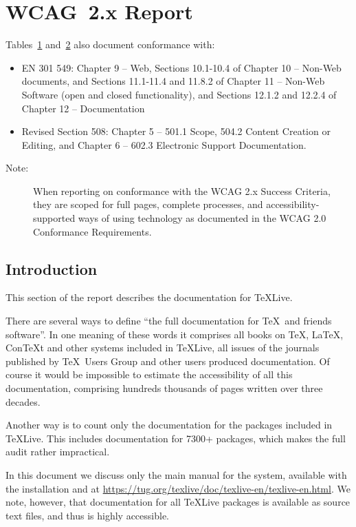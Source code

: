 \documentclass[titlepage]{article}
\begin{document}
\clearpage
\section{WCAG~2.x Report}
\label{sec:wcag}

Tables~\hyperref[sec:WCAG-A]{1} and~\hyperref[sec:WCAG-AA]{2} also document 
conformance with: 
\begin{itemize}
\item EN 301 549:  Chapter 9 – Web, Sections 10.1-10.4 of Chapter 10 – 
    Non-Web documents, and Sections 11.1-11.4 and 11.8.2 of Chapter 11 – 
    Non-Web Software (open and closed functionality), and Sections 12.1.2 
    and 12.2.4 of Chapter 12 – Documentation 
\item Revised Section 508: Chapter 5 – 501.1 Scope, 504.2 Content
  Creation or Editing, and Chapter 6 – 602.3 Electronic Support
  Documentation.
\end{itemize}

\begin{description}
\item[Note:] When reporting on conformance with the WCAG 2.x Success
  Criteria, they are scoped for full pages, complete processes, and
  accessibility-supported ways of using technology as documented in
  the WCAG 2.0 Conformance Requirements.
\end{description}

\subsection{Introduction}
\label{sec:wcag-intro}

This section of the report describes the documentation for \TeX Live.

There are several ways to define ``the full documentation for \TeX\
and friends software''.  In one meaning of these words it comprises
all books on \TeX, \LaTeX, Con\TeX t and other systems included in
\TeX Live, all issues of the journals published by \TeX\ Users Group
and other users produced documentation.  Of course it would be
impossible to estimate the accessibility of all this documentation,
comprising hundreds thousands of pages written over three decades.

Another way is to count only the documentation for the packages
included in \TeX Live.  This includes documentation for 7300+
packages, which makes the full audit rather impractical.

In this document we discuss only the main manual for the system,
available with the installation and at
\url{https://tug.org/texlive/doc/texlive-en/texlive-en.html}.  We
note, however, that documentation for all \TeX Live packages is
available as source text files, and thus is highly accessible.  
\end{document}
